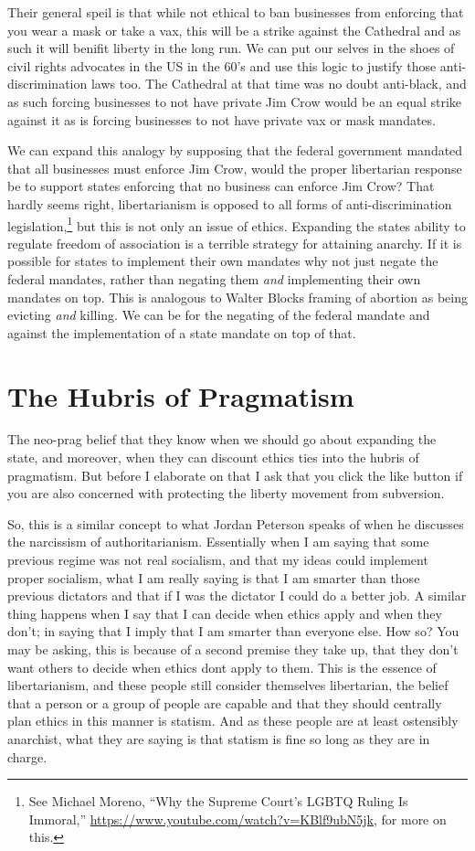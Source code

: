 \documentclass[11pt]{article}
\begin{document}
Their general speil is that while not ethical to ban businesses from enforcing that you wear a mask or take a vax, this will be a strike against the Cathedral and as such it will benifit liberty in the long run. We can put our selves in the shoes of civil rights advocates in the US in the 60's and use this logic to justify those anti-discrimination laws too. The Cathedral at that time was no doubt anti-black, and as such forcing businesses to not have private Jim Crow would be an equal strike against it as is forcing businesses to not have private vax or mask mandates.

We can expand this analogy by supposing that the federal government mandated that all businesses must enforce Jim Crow, would the proper libertarian response be to support states enforcing that no business can enforce Jim Crow? That hardly seems right, libertarianism is opposed to all forms of anti-discrimination legislation,\footnote{See Michael Moreno, ``Why the Supreme Court's LGBTQ Ruling Is Immoral,'' \url{https://www.youtube.com/watch?v=KBlf9ubN5jk}, for more on this.} but this is not only an issue of ethics. Expanding the states ability to regulate freedom of association is a terrible strategy for attaining anarchy. If it is possible for states to implement their own mandates why not just negate the federal mandates, rather than negating them \emph{and} implementing their own mandates on top. This is analogous to Walter Blocks framing of abortion as being evicting \emph{and} killing. We can be for the negating of the federal mandate and against the implementation of a state mandate on top of that.

\section{The Hubris of Pragmatism}
\label{sec:org14af6b5}
The neo-prag belief that they know when we should go about expanding the state, and moreover, when they can discount ethics ties into the hubris of pragmatism. But before I elaborate on that I ask that you click the like button if you are also concerned with protecting the liberty movement from subversion.

So, this is a similar concept to what Jordan Peterson speaks of when he discusses the narcissism of authoritarianism. Essentially when I am saying that some previous regime was not real socialism, and that my ideas could implement proper socialism, what I am really saying is that I am smarter than those previous dictators and that if I was the dictator I could do a better job. A similar thing happens when I say that I can decide when ethics apply and when they don't; in saying that I imply that I am smarter than everyone else. How so? You may be asking, this is because of a second premise they take up, that they don't want others to decide when ethics dont apply to them. This is the essence of libertarianism, and these people still consider themselves libertarian, the belief that a person or a group of people are capable and that they should centrally plan ethics in this manner is statism. And as these people are at least ostensibly anarchist, what they are saying is that statism is fine so long as they are in charge.
\end{document}
